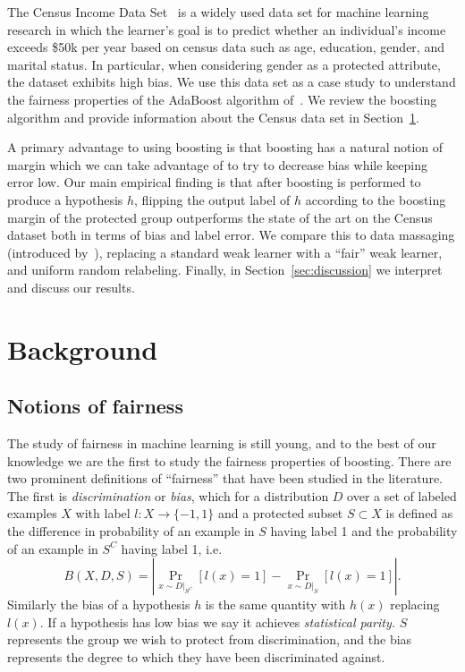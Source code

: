 \documentclass{article}
\begin{document}
The Census Income Data Set~\citep{UCIAdult} is a widely used data set for
machine learning research in which the learner's goal is to predict whether an
individual's income exceeds \$50k per year based on census data such as age,
education, gender, and marital status. In particular, when considering gender
as a protected attribute, the dataset exhibits high bias. We use this data set
as a case study to understand the fairness properties of the AdaBoost algorithm
of~\citet{FreundS97}. We review the boosting algorithm and provide information
about the Census data set in Section~\ref{sec:background}.

A primary advantage to using boosting is that boosting has a natural notion of
margin which we can take advantage of to try to decrease bias while keeping error low.
Our main empirical finding is that after boosting is performed to produce a
hypothesis $h$, flipping the output label of $h$ according to the boosting
margin of the protected group outperforms the state of the art on the Census
dataset both in terms of bias and label error. We compare this to data
massaging (introduced by~\citet{KamiranC09}), replacing a standard weak learner with
a ``fair'' weak learner, and uniform random relabeling. Finally, in
Section~\ref{sec:discussion} we interpret and discuss our results. 

\section{Background} \label{sec:background}

\subsection{Notions of fairness} The study of fairness in machine learning is
still young, and to the best of our knowledge we are the first to study the
fairness properties of boosting.  There are two prominent definitions of
``fairness'' that have been studied in the literature. The first is
\emph{discrimination} or \emph{bias}, which for a distribution $D$ over a set
of labeled examples $X$ with label $l : X \to \{-1, 1\}$ and a protected subset
$S \subset X$ is defined as the difference in probability of an example in $S$
having label 1 and the probability of an example in $S^C$ having label 1, i.e.
$$ B(X, D, S) = \left | \Pr_{x \sim D|_{S^C}}[l(x) = 1] - \Pr_{x \sim D|_{S}}
[l(x) = 1]  \right |. $$ Similarly the bias of a hypothesis $h$ is the same
quantity with $h(x)$ replacing $l(x)$. If a hypothesis has low bias we say it
achieves \emph{statistical parity.}  $S$ represents the group we wish to protect
from discrimination, and the bias represents the degree to which they have been
discriminated against.
\end{document}
